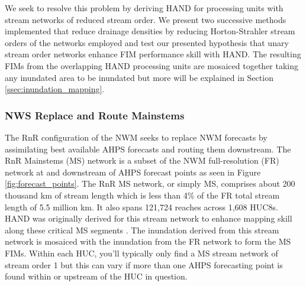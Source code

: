 %
We seek to resolve this problem by deriving HAND for processing units with stream networks of reduced stream order. 
We present two successive methods implemented that reduce drainage densities by reducing Horton-Strahler stream orders of the networks employed and test our presented hypothesis that unary stream order networks enhance FIM performance skill with HAND.
The resulting FIMs from the overlapping HAND processing units are mosaiced together taking any inundated area to be inundated but more will be explained in Section \ref{ssec:inundation_mapping}.
%
\subsubsection{NWS Replace and Route Mainstems}
\label{sssec:replace_and_route_mainstems}
%
The RnR configuration of the NWM seeks to replace NWM forecasts by assimilating best available AHPS forecasts and routing them downstream.
The RnR Mainstems (MS) network is a subset of the NWM full-resolution (FR) network at and downstream of AHPS forecast points as seen in Figure \ref{fig:forecast_points}.
The RnR MS network, or simply MS, comprises about 200 thousand km of stream length which is less than 4\% of the FR total stream length of 5.5 million km.
It also spans 121,724 reaches across 1,608 HUC8s.
HAND was originally derived for this stream network to enhance mapping skill along these critical MS segments \cite{djokic2019arc}. 
The inundation derived from this stream network is mosaiced with the inundation from the FR network to form the MS FIMs. 
Within each HUC, you'll typically only find a MS stream network of stream order 1 but this can vary if more than one AHPS forecasting point is found within or upstream of the HUC in question.
%
